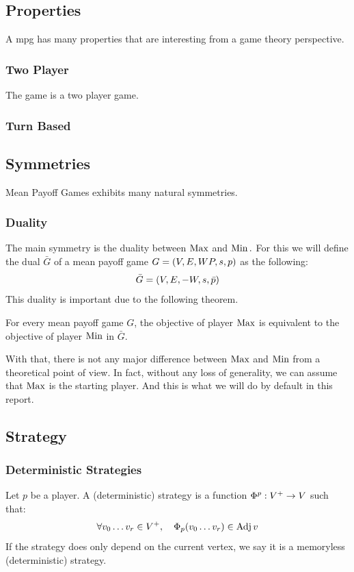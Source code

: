 \subsection{Properties}
A \acrshort{mpg} has many properties that are interesting from a game theory perspective.
\subsubsection{Two Player}
The game is a two player game.
\subsubsection{Turn Based}

\subsection{Symmetries}
Mean Payoff Games exhibits many natural symmetries.
\subsubsection{Duality}
The main symmetry is the duality between 
$\operatorname{Max}$ and $\operatorname{Min}.$
\newline For this we will define the dual $\bar{G}$ of a mean payoff game $G=(V,E,WP,s,p)$ as the following:
$$
\bar{G}= (V,E,-W,s,\bar{p})
$$
This duality is important due to the following theorem.
\begin{theorem}
	For every mean payoff game $G$, the objective of player $\operatorname{Max}$ is equivalent to the objective of player $\operatorname{Min}$ in $\bar{G}.$
\end{theorem}
With that, there is not any major difference between $\operatorname{Max}$ and $\operatorname{Min}$ from a theoretical point of view.
\newline In fact, without any loss of generality, we can assume that $\operatorname{Max}$ is the starting player. And this is what we will do by default in this report.

\subsection{Strategy}
\label{section:Formalisation:Strategy}
\subsubsection{Deterministic Strategies}
\label{section:Formalisation:Strategy:Deterministic}
\label{section:Formalisation:Strategy:Positional}
Let $p$ be a player. \newline 
A (deterministic) strategy is a function $\Phi^{p}:V^+\rightarrow V$ such that:
$$
\forall v_0\dots v_r\in V^+, \quad \Phi_p(v_0\dots v_r) \in \operatorname{Adj} v
$$	
If the strategy does only depend on the current vertex, we say it is a memoryless (deterministic) strategy. 


